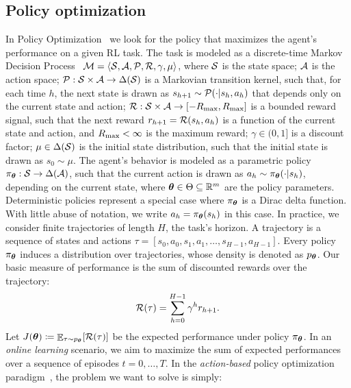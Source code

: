 \documentclass{article}
\begin{document}
\subsection{Policy optimization}
In Policy Optimization~\citep{deisenroth2013survey} we look for the policy that maximizes the agent's performance on a given RL task. The task is modeled as a discrete-time Markov Decision Process~\citep[MDP,][]{puterman2014markov} $\mathcal{M} = \langle\mathcal{S},\mathcal{A},\mathcal{P},\mathcal{R},\gamma,\mu\rangle$, where $\mathcal{S}$ is the state space; $\mathcal{A}$ is the action space; $\mathcal{P}:\mathcal{S}\times\mathcal{A}\to\Delta(\mathcal{S})$ is a Markovian transition kernel, such that, for each time $h$, the next state is drawn as $s_{h+1}\sim\mathcal{P}(\cdot|s_h,a_h)$ that depends only on the current state and action; $\mathcal{R}:\mathcal{S}\times\mathcal{A}\to[-R_{\max},R_{\max}]$ is a bounded reward signal, such that the next reward $r_{h+1} = \mathcal{R}(s_h,a_h)$ is a function of the current state and action, and $R_{\max}<\infty$ is the maximum reward; $\gamma\in(0,1]$ is a discount factor; $\mu\in\Delta(\mathcal{S})$ is the initial state distribution, such that the initial state is drawn as $s_0\sim\mu$. The agent's behavior is modeled as a parametric policy $\pi_{\boldsymbol{\theta}}:\mathcal{S}\to\Delta(\mathcal{A})$, such that the current action is drawn as $a_h\sim\pi_{\boldsymbol{\theta}}(\cdot|s_h)$, depending on the current state, where $\boldsymbol{\theta}\in\Theta\subseteq\mathbb{R}^m$ are the policy parameters. Deterministic policies represent a special case where $\pi_{\boldsymbol{\theta}}$ is a Dirac delta function. With little abuse of notation, we write $a_h=\pi_{\boldsymbol{\theta}}(s_h)$ in this case. In practice, we consider finite trajectories of length $H$, the task's horizon.
A trajectory is a sequence of states and actions $\tau=[s_0,a_0,s_1,a_1,\dots,s_{H-1},a_{H-1}]$. Every policy $\pi_{\boldsymbol{\theta}}$ induces a distribution over trajectories, whose density is denoted as $p_{\boldsymbol{\theta}}$. Our basic measure of performance is the sum of discounted rewards over the trajectory:
\begin{align}\label{eq:Rtau}
	\mathcal{R}(\tau) = \sum_{h=0}^{H-1}\gamma^hr_{h+1}.
\end{align}
Let $J(\boldsymbol{\theta}) \coloneqq \mathop{\mathbb{E}}_{\tau\sim p_{\boldsymbol{\theta}}}[\mathcal{R}(\tau)]$ be the expected performance under policy $\pi_{\boldsymbol{\theta}}$. In an \textit{online learning} scenario, we aim to maximize the sum of expected performances over a sequence of episodes $t=0,\dots,T$. 
In the \textit{action-based} policy optimization paradigm~\citep{peters2008reinforcement}, the problem we want to solve is simply:
\end{document}
